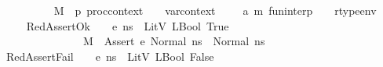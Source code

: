 \begin{isabellebody}
\ \ {\isacharparenleft}{\kern0pt}{\isachardoublequoteopen}{\isacharunderscore}{\kern0pt}{\isacharcomma}{\kern0pt}{\isacharunderscore}{\kern0pt}{\isacharcomma}{\kern0pt}{\isacharunderscore}{\kern0pt}{\isacharcomma}{\kern0pt}{\isacharunderscore}{\kern0pt}\ {\isasymturnstile}\ {\isacharparenleft}{\kern0pt}{\isacharparenleft}{\kern0pt}{\isasymlangle}{\isacharunderscore}{\kern0pt}{\isacharcomma}{\kern0pt}{\isacharunderscore}{\kern0pt}{\isasymrangle}{\isacharparenright}{\kern0pt}\ {\isasymrightarrow}{\isacharslash}{\kern0pt}\ {\isacharunderscore}{\kern0pt}{\isacharparenright}{\kern0pt}{\isachardoublequoteclose}\ {\isacharbrackleft}{\kern0pt}{}{}{\isacharcomma}{\kern0pt}{}{\isacharcomma}{\kern0pt}{}{\isacharbrackright}{\kern0pt}\ {}{}{\isacharparenright}{\kern0pt}\isanewline
\ \ \ M\ {\isacharcolon}{\kern0pt}{\isacharcolon}{\kern0pt}\ {\isachardoublequoteopen}{\isacharprime}{\kern0pt}p\ proc{\isacharunderscore}{\kern0pt}context{\isachardoublequoteclose}\ \ {\isasymLambda}\ {\isacharcolon}{\kern0pt}{\isacharcolon}{\kern0pt}\ var{\isacharunderscore}{\kern0pt}context\ \ \ {\isasymGamma}\ {\isacharcolon}{\kern0pt}{\isacharcolon}{\kern0pt}\ {\isachardoublequoteopen}{\isacharparenleft}{\kern0pt}{\isacharprime}{\kern0pt}a{\isacharcomma}{\kern0pt}\ {\isacharprime}{\kern0pt}m{\isacharparenright}{\kern0pt}\ fun{\isacharunderscore}{\kern0pt}interp{\isachardoublequoteclose}\ \ {\isasymOmega}\ {\isacharcolon}{\kern0pt}{\isacharcolon}{\kern0pt}\ rtype{\isacharunderscore}{\kern0pt}env\isanewline
\ \ \isanewline
\ \ \ \ RedAssertOk{\isacharcolon}{\kern0pt}\ {\isachardoublequoteopen}{\isasymlbrakk}\ {\isasymLambda}{\isacharcomma}{\kern0pt}{\isasymGamma}{\isacharcomma}{\kern0pt}{\isasymOmega}\ {\isasymturnstile}\ {\isasymlangle}e{\isacharcomma}{\kern0pt}\ n{\isacharunderscore}{\kern0pt}s{\isasymrangle}\ {\isasymDown}\ LitV\ {\isacharparenleft}{\kern0pt}LBool\ True{\isacharparenright}{\kern0pt}\ {\isasymrbrakk}\ {\isasymLongrightarrow}\ \isanewline
\ \ \ \ \ \ \ \ \ \ \ \ \ \ \ \ \ M{\isacharcomma}{\kern0pt}{\isasymLambda}{\isacharcomma}{\kern0pt}{\isasymGamma}{\isacharcomma}{\kern0pt}{\isasymOmega}\ {\isasymturnstile}\ {\isasymlangle}Assert\ e{\isacharcomma}{\kern0pt}\ Normal\ n{\isacharunderscore}{\kern0pt}s{\isasymrangle}\ {\isasymrightarrow}\ Normal\ n{\isacharunderscore}{\kern0pt}s{\isachardoublequoteclose}\isanewline
\ \ {\isacharbar}{\kern0pt}\ RedAssertFail{\isacharcolon}{\kern0pt}\ {\isachardoublequoteopen}{\isasymlbrakk}\ {\isasymLambda}{\isacharcomma}{\kern0pt}{\isasymGamma}{\isacharcomma}{\kern0pt}{\isasymOmega}\ {\isasymturnstile}\ {\isasymlangle}e{\isacharcomma}{\kern0pt}\ n{\isacharunderscore}{\kern0pt}s{\isasymrangle}\ {\isasymDown}\ LitV\ {\isacharparenleft}{\kern0pt}LBool\ False{\isacharparenright}{\kern0pt}\ {\isasymrbrakk}\ {\isasymLongrightarrow}\ \isanewline

\end{isabellebody}
